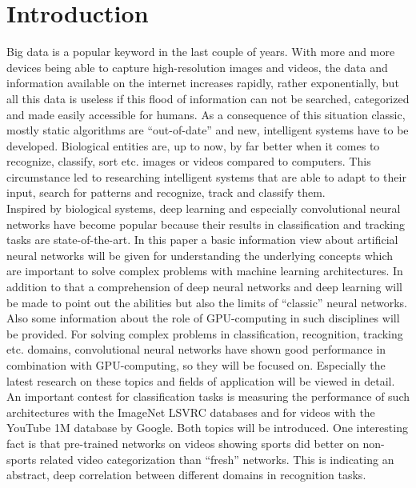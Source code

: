 \documentclass[12pt,twoside]{article}
\theoremstyle{plain}
\theoremstyle{definition}
\theoremstyle{remark}
\begin{document}
\setcounter{tocdepth}{2} 					%
\tableofcontents
{}
\clearpage












\section{Introduction}
\label{sec:introduction}

Big data is a popular keyword in the last couple of years. With more and more devices being able to capture high-resolution images and videos, the data and information available on the internet increases rapidly, rather exponentially, but all this data is useless if this flood of information can not be searched, categorized and made easily accessible for humans. As a consequence of this situation classic, mostly static algorithms are \enquote{out-of-date} and new, intelligent systems have to be developed. Biological entities are, up to now, by far better when it comes to recognize, classify, sort etc. images or videos compared to computers. This circumstance led to researching intelligent systems that are able to adapt to their input, search for patterns and recognize, track and classify them.
\\
Inspired by biological systems, deep learning and especially convolutional neural networks have become popular because their results in classification and tracking tasks are state-of-the-art. In this paper a basic information view about artificial neural networks will be given for understanding the underlying concepts which are important to solve complex problems with machine learning architectures. In addition to that a comprehension of deep neural networks and deep learning will be made to point out the abilities but also the limits of \enquote{classic} neural networks. Also some information about the role of GPU-computing in such disciplines will be provided. For solving complex problems in classification, recognition, tracking etc. domains, convolutional neural networks have shown good performance in combination with GPU-computing, so they will be focused on. Especially the latest research on these topics and fields of application will be viewed in detail. An important contest for classification tasks is measuring the performance of such architectures with the ImageNet LSVRC databases and for videos with the YouTube 1M database by Google. Both topics will be introduced. One interesting fact is that pre-trained networks on videos showing sports did better on non-sports related video categorization than \enquote{fresh} networks. This is indicating an abstract, deep correlation between different domains in recognition tasks.
\end{document}
